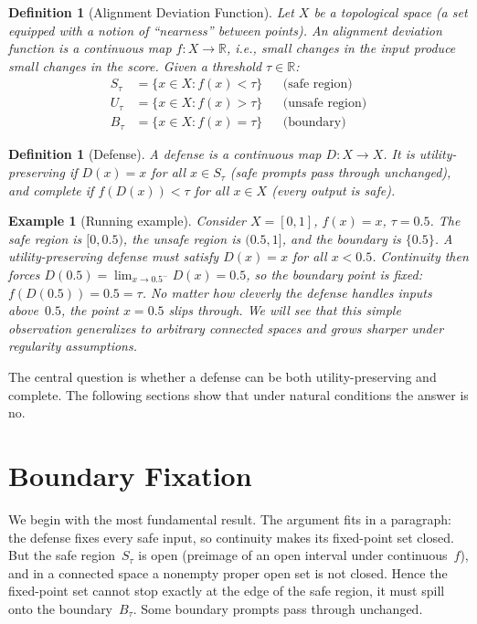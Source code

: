 \documentclass[11pt]{article}
\newtheorem{definition}[theorem]{Definition}
\newtheorem{example}[theorem]{Example}
\newcommand{\R}{\mathbb{R}}
\begin{document}
\begin{definition}[Alignment Deviation Function]
\label{def:ad}
Let $X$ be a topological space (a set equipped with a notion of
``nearness'' between points). An \emph{alignment deviation function} is
a continuous map $f\colon X \to \R$, i.e., small changes in the
input produce small changes in the score. Given a threshold
$\tau\in\R$:
\begin{align}
  S_\tau &= \{x \in X : f(x) < \tau\}  &&\text{(safe region)} \\
  U_\tau &= \{x \in X : f(x) > \tau\}  &&\text{(unsafe region)} \\
  B_\tau &= \{x \in X : f(x) = \tau\}  &&\text{(boundary)}
\end{align}
\end{definition}

\begin{definition}[Defense]
\label{def:defense}
A \emph{defense} is a continuous map $D\colon X \to X$. It is
\emph{utility-preserving} if $D(x) = x$ for all $x \in S_\tau$
(safe prompts pass through unchanged),
and \emph{complete} if $f(D(x)) < \tau$ for all $x\in X$
(every output is safe).
\end{definition}

\begin{example}[Running example]
\label{ex:running}
Consider $X = [0,1]$, $f(x) = x$, $\tau = 0.5$. The safe region is
$[0, 0.5)$, the unsafe region is $(0.5, 1]$, and the boundary is
$\{0.5\}$. A utility-preserving defense must satisfy $D(x) = x$ for all
$x < 0.5$. Continuity then forces $D(0.5) = \lim_{x \to 0.5^-} D(x)
= 0.5$, so the boundary point is fixed: $f(D(0.5)) = 0.5 = \tau$. No
matter how cleverly the defense handles inputs above~$0.5$, the point
$x = 0.5$ slips through. We will see that this simple observation
generalizes to arbitrary connected spaces and grows sharper under
regularity assumptions.
\end{example}

The central question is whether a defense can be both
utility-preserving and complete. The following sections show that under
natural conditions the answer is no.


\section{Boundary Fixation}
\label{sec:boundary}

We begin with the most fundamental result. The argument fits in a
paragraph: the defense fixes every safe input, so continuity makes its
fixed-point set closed. But the safe region~$S_\tau$ is open (preimage
of an open interval under continuous~$f$), and in a connected space a
nonempty proper open set is not closed. Hence the fixed-point set
cannot stop exactly at the edge of the safe region, it must spill onto
the boundary~$B_\tau$. Some boundary prompts pass through unchanged.
\end{document}
